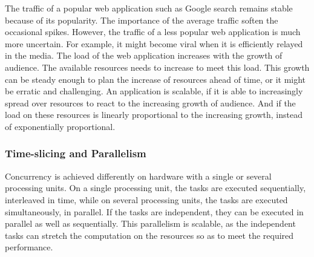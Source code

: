 The traffic of a popular web application such as Google search remains stable because of its popularity.
The importance of the average traffic soften the occasional spikes.
However, the traffic of a less popular web application is much more uncertain.
For example, it might become viral when it is efficiently relayed in the media.
The load of the web application increases with the growth of audience.
The available resources needs to increase to meet this load.
This growth can be steady enough to plan the increase of resources ahead of time, or it might be erratic and challenging.
An application is scalable, if it is able to increasingly spread over resources to react to the increasing growth of audience.
And if the load on these resources is linearly proportional to the increasing growth, instead of exponentially proportional.

\subsubsection{Time-slicing and Parallelism}

Concurrency is achieved differently on hardware with a single or several processing units.
On a single processing unit, the tasks are executed sequentially, interleaved in time, while on several processing units, the tasks are executed simultaneously, in parallel.
If the tasks are independent, they can be executed in parallel as well as sequentially.
This parallelism is scalable, as the independent tasks can stretch the computation on the resources so as to meet the required performance.

